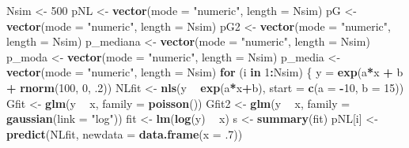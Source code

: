 \documentclass[a4paper]{article}
\newenvironment{Shaded}{\begin{snugshade}}{\end{snugshade}}
\newcommand{\KeywordTok}[1]{\textcolor[rgb]{0.13,0.29,0.53}{\textbf{#1}}}
\newcommand{\DataTypeTok}[1]{\textcolor[rgb]{0.13,0.29,0.53}{#1}}
\newcommand{\DecValTok}[1]{\textcolor[rgb]{0.00,0.00,0.81}{#1}}
\newcommand{\StringTok}[1]{\textcolor[rgb]{0.31,0.60,0.02}{#1}}
\newcommand{\ControlFlowTok}[1]{\textcolor[rgb]{0.13,0.29,0.53}{\textbf{#1}}}
\newcommand{\OperatorTok}[1]{\textcolor[rgb]{0.81,0.36,0.00}{\textbf{#1}}}
\newcommand{\NormalTok}[1]{#1}
\begin{document}
\begin{Shaded}
\begin{Highlighting}[]
\NormalTok{Nsim <-}\StringTok{ }\DecValTok{500}
\NormalTok{pNL <-}\StringTok{ }\KeywordTok{vector}\NormalTok{(}\DataTypeTok{mode =} \StringTok{"numeric"}\NormalTok{, }\DataTypeTok{length =}\NormalTok{ Nsim)}
\NormalTok{pG <-}\StringTok{ }\KeywordTok{vector}\NormalTok{(}\DataTypeTok{mode =} \StringTok{"numeric"}\NormalTok{, }\DataTypeTok{length =}\NormalTok{ Nsim)}
\NormalTok{pG2 <-}\StringTok{ }\KeywordTok{vector}\NormalTok{(}\DataTypeTok{mode =} \StringTok{"numeric"}\NormalTok{, }\DataTypeTok{length =}\NormalTok{ Nsim)}
\NormalTok{p_mediana <-}\StringTok{ }\KeywordTok{vector}\NormalTok{(}\DataTypeTok{mode =} \StringTok{"numeric"}\NormalTok{, }\DataTypeTok{length =}\NormalTok{ Nsim)}
\NormalTok{p_moda <-}\StringTok{ }\KeywordTok{vector}\NormalTok{(}\DataTypeTok{mode =} \StringTok{"numeric"}\NormalTok{, }\DataTypeTok{length =}\NormalTok{ Nsim)}
\NormalTok{p_media <-}\StringTok{ }\KeywordTok{vector}\NormalTok{(}\DataTypeTok{mode =} \StringTok{"numeric"}\NormalTok{, }\DataTypeTok{length =}\NormalTok{ Nsim)}
\ControlFlowTok{for}\NormalTok{ (i }\ControlFlowTok{in} \DecValTok{1}\OperatorTok{:}\NormalTok{Nsim) \{}
\NormalTok{  y =}\StringTok{ }\KeywordTok{exp}\NormalTok{(a}\OperatorTok{*}\NormalTok{x }\OperatorTok{+}\StringTok{ }\NormalTok{b }\OperatorTok{+}\StringTok{ }\KeywordTok{rnorm}\NormalTok{(}\DecValTok{100}\NormalTok{, }\DecValTok{0}\NormalTok{, .}\DecValTok{2}\NormalTok{))}
\NormalTok{  NLfit <-}\StringTok{ }\KeywordTok{nls}\NormalTok{(y }\OperatorTok{~}\StringTok{ }\KeywordTok{exp}\NormalTok{(a}\OperatorTok{*}\NormalTok{x}\OperatorTok{+}\NormalTok{b), }\DataTypeTok{start =} \KeywordTok{c}\NormalTok{(}\DataTypeTok{a =} \OperatorTok{-}\DecValTok{10}\NormalTok{, }\DataTypeTok{b =} \DecValTok{15}\NormalTok{)) }
\NormalTok{  Gfit <-}\StringTok{ }\KeywordTok{glm}\NormalTok{(y }\OperatorTok{~}\StringTok{ }\NormalTok{x, }\DataTypeTok{family =} \KeywordTok{poisson}\NormalTok{())}
\NormalTok{  Gfit2 <-}\StringTok{ }\KeywordTok{glm}\NormalTok{(y }\OperatorTok{~}\StringTok{ }\NormalTok{x, }\DataTypeTok{family =} \KeywordTok{gaussian}\NormalTok{(}\DataTypeTok{link =} \StringTok{"log"}\NormalTok{))}
\NormalTok{  fit <-}\StringTok{ }\KeywordTok{lm}\NormalTok{(}\KeywordTok{log}\NormalTok{(y) }\OperatorTok{~}\StringTok{ }\NormalTok{x)}
\NormalTok{  s <-}\StringTok{ }\KeywordTok{summary}\NormalTok{(fit)}
\NormalTok{  pNL[i] <-}\StringTok{ }\KeywordTok{predict}\NormalTok{(NLfit, }\DataTypeTok{newdata =} \KeywordTok{data.frame}\NormalTok{(}\DataTypeTok{x =}\NormalTok{ .}\DecValTok{7}\NormalTok{))}

\end{Highlighting}
\end{Shaded}
\end{document}
